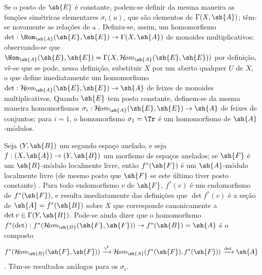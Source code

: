 \documentclass[oneside,10pt]{amsart}
\makeatletter
\newcommand{\ega@arrow}[2]{\mathchoice{#1}{#2}{#2}{#2}}
\renewcommand{\to}{\ega@arrow{\longrightarrow}{\rightarrow}}
\def\shHom{\mathcal{H}\!\mathit{om}}
\newcommand{\oldpage}[2][]{\marginnote{\normalfont\footnotesize\textbf{#1}~|~#2}\ignorespaces}
\makeatother
\begin{document}
\begin{env}[6.4.8]
Se o posto de $\sh{E}$ é constante, podem-se definir da mesma maneira as funções simétricas elementares $\sigma_i(u)$, que são elementos de $\Gamma(X,\sh{A})$;
têm-se novamente as relações de  a .
\oldpage[II]{124}
Definiu-se, assim, um homomorfismo $\det:\Hom_{\sh{A}}(\sh{E},\sh{E})\to\Gamma(X,\sh{A})$ de monoides multiplicativos;
observando-se que $\Hom_{\sh{A}}(\sh{E},\sh{E})=\Gamma(X,\shHom_{\sh{A}}(\sh{E},\sh{E}))$ por definição, vê-se que se pode, nessa definição, substituir $X$ por um aberto qualquer $U$ de $X$, o que define imediatamente um homomorfismo $\det:\shHom_{\sh{A}}(\sh{E},\sh{E})\to\sh{A}$ de feixes de monoides multiplicativos.
Quando $\sh{E}$ tem posto constante, definem-se da mesma maneira homomorfismos $\sigma_i:\shHom_{\sh{A}}(\sh{E},\sh{E})\to\sh{A}$ de feixes de conjuntos;
para $i=1$, o homomorfismo $\sigma_1=\Tr$ é um homomorfismo de $\sh{A}$-módulos.

Seja $(Y,\sh{B})$ um segundo espaço anelado, e seja $f:(X,\sh{A})\to(Y,\sh{B})$ um morfismo de espaços anelados;
se $\sh{F}$ é um $\sh{B}$-módulo localmente livre, então $f^*(\sh{F})$ é um $\sh{A}$-módulo localmente livre (de mesmo posto que $\sh{F}$ se este último tiver posto constante) .
Para todo endomorfismo $v$ de $\sh{F}$, $f^*(v)$ é um endomorfismo de $f^*(\sh{F})$, e resulta imediatamente das definições que $\det f^*(v)$ é a seção de $\sh{A}=f^*(\sh{B})$ sobre $X$ que corresponde canonicamente a $\det v\in\Gamma(Y,\sh{B})$.
Pode-se ainda dizer que o homomorfismo $f^*(\det):f^*(\shHom_{\sh{B}}(\sh{F},\sh{F}))\to f^*(\sh{B})=\sh{A}$ é o composto
\[
  f^*(\shHom_{\sh{B}}(\sh{F},\sh{F}))
  \xrightarrow{\gamma^\sharp} \shHom_{\sh{A}}(f^*(\sh{F}),f^*(\sh{F}))
  \xrightarrow{\det} \sh{A}
\]
.
Têm-se resultados análogos para os $\sigma_i$.
\end{env}
\end{document}
